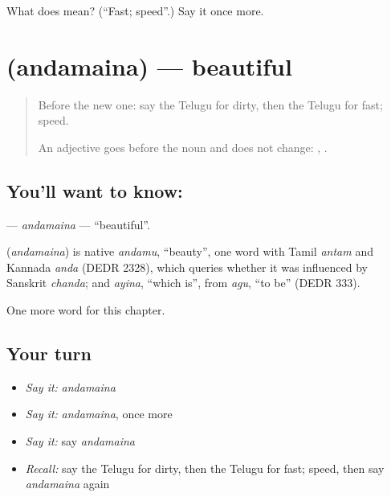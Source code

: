 \begin{tcolorbox}[breakable,colback=teal!4,colframe=teal!35!black,title={Before you move on}]
What does  mean? (\textquotedblleft{}Fast; speed\textquotedblright{}.) Say it once more.
\end{tcolorbox}
\section[\texorpdfstring{\te{అందమైన} (andamaina)}{అందమైన (andamaina)}]{ (andamaina) — beautiful}

\label{lesson:TE-C138-andamaina}



\begin{quote}
Before the new one: say the Telugu for dirty, then the Telugu for fast; speed.

An adjective goes before the noun and does not change: \textbf{ }, \textbf{ }.
\end{quote}

\subsection*{You'll want to know: }
\textbf{} — \emph{andamaina} — \textquotedblleft{}beautiful\textquotedblright{}.

\begin{cousinweb}
\textbf{} (\emph{andamaina}) is native \emph{andamu}, \textquotedblleft{}beauty\textquotedblright{}, one word with Tamil \emph{antam} and Kannada \emph{anda} (DEDR 2328), which queries whether it was influenced by Sanskrit \emph{chanda}; and \emph{ayina}, \textquotedblleft{}which is\textquotedblright{}, from \emph{agu}, \textquotedblleft{}to be\textquotedblright{} (DEDR 333).
\end{cousinweb}

\begin{grammarlens}[title={What you've built}]
One more word for this chapter.
\end{grammarlens}

\subsection*{Your turn}
\begin{itemize}
\raggedright
  \item \emph{Say it:} \emph{andamaina}
  \item \emph{Say it:} \emph{andamaina}, once more
  \item \emph{Say it:} say \emph{andamaina}
  \item \emph{Recall:} say the Telugu for dirty, then the Telugu for fast; speed, then say \emph{andamaina} again
\end{itemize}

